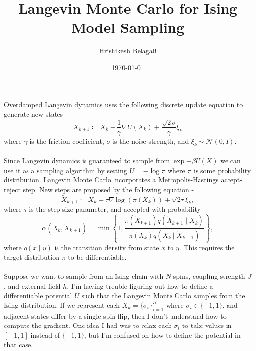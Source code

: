 \documentclass{article}
\title{Langevin Monte Carlo for Ising Model Sampling}
\author{Hrishikesh Belagali}
\date{\today}
\begin{document}
\maketitle
\noindent Overdamped Langevin dynamics uses the following discrete update equation to generate new states - 
$$X_{k+1} \coloneq X_k - \frac{1}{\gamma} \nabla U(X_k) + \frac{\sqrt{2} \sigma}{\gamma}\xi_k$$
where $\gamma$ is the friction coefficient, $\sigma$ is the noise strength, and $\xi_k \sim \mathcal{N}(0, I)$. \\\\
Since Langevin dynamics is guaranteed to sample from $\exp{-\beta U(X)}$
we can use it as a sampling algorithm by setting $U = - \log \pi$ where $\pi$ is some probability distribution. 
Langevin Monte Carlo incorporates a Metropolis-Hastings accept-reject step. New steps are proposed 
by the following equation - 
$$\tilde{X}_{k+1} \coloneq X_k + \tau \nabla \log(\pi(X_k)) + \sqrt{2\tau} \xi_k,$$
where $\tau$ is the step-size parameter, and accepted with probability 
$$\alpha(X_k, \tilde{X}_{k+1}) = \min \left\{ 1, \frac{\pi(\tilde{X}_{k+1}) q(\tilde{X}_{k+1} \mid X_k)}{\pi(X_k) q(X_k \mid \tilde{X}_{k+1})} \right\},$$
where $q(x \mid y)$ is the transition density from state $x$ to $y$. This requires the target distribution $\pi$ to be differentiable.  \\\\
Suppose we want to sample from an Ising chain with $N$ spins, coupling strength $J$, and external field $h$.
I'm having trouble figuring out how to define a differentiable potential 
$U$ such that the Langevin Monte Carlo samples from the Ising distribution. If we represent 
each $X_k = \{\sigma_i\}_{i=1}^N$ where $\sigma_i \in \{-1, 1\}$, and adjacent 
states differ by a single spin flip, then I don't understand how to compute the gradient.
One idea I had was to relax each $\sigma_i$ to take values in $[-1, 1]$ instead of $\{-1, 1\}$,
but I'm confused on how to define the potential in that case. 
\end{document}
